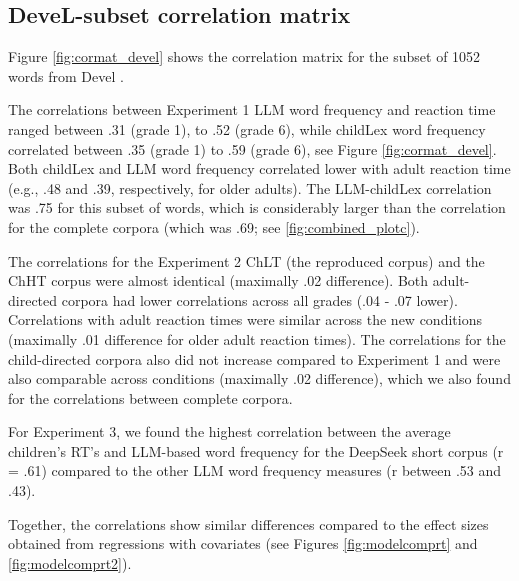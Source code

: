 \documentclass[doc, a4paper, anonymous]{apa7}
\begin{document}
\clearpage

\subsection{DeveL-subset correlation matrix}

Figure \ref{fig:cormat_devel} shows the correlation matrix for the subset of 1052 words from Devel \citep{schroter_developmental_2017}. 

The correlations between Experiment 1 LLM word frequency and reaction time ranged between .31 (grade 1), to .52 (grade 6), while childLex word frequency correlated between .35 (grade 1) to .59 (grade 6), see Figure \ref{fig:cormat_devel}. Both childLex and LLM word frequency correlated lower with adult reaction time (e.g., .48 and .39, respectively, for older adults). The LLM-childLex correlation was .75 for this subset of words, which is considerably larger than the correlation for the complete corpora (which was .69; see \ref{fig:combined_plotc}).

The correlations for the Experiment 2 ChLT (the reproduced corpus) and the ChHT corpus were almost identical (maximally .02 difference). Both adult-directed corpora had lower correlations across all grades (.04 - .07 lower). Correlations with adult reaction times were similar across the new conditions (maximally .01 difference for older adult reaction times). The correlations for the child-directed corpora also did not increase compared to Experiment 1 and were also comparable across conditions (maximally .02 difference), which we also found for the correlations between complete corpora. 

For Experiment 3, we found the highest correlation between the average children’s RT’s and LLM-based word frequency for the DeepSeek short corpus (r = .61) compared to the other LLM word frequency measures (r between .53 and .43). 

Together, the correlations show similar differences compared to the effect sizes obtained from regressions with covariates (see Figures \ref{fig:modelcomprt} and \ref{fig:modelcomprt2}). 
\end{document}
